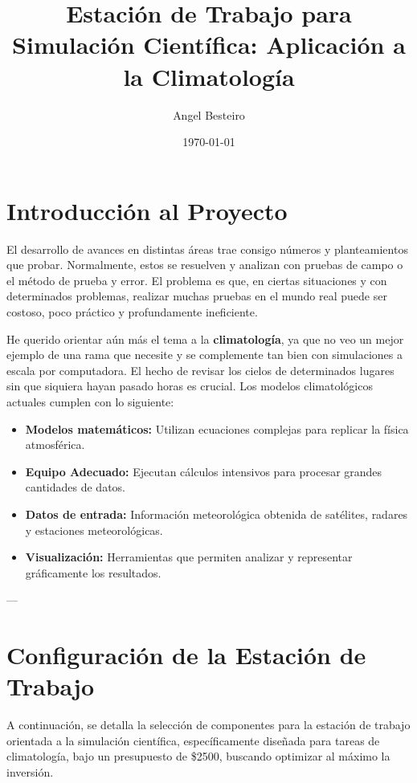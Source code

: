 \documentclass{article}
\title{Estación de Trabajo para Simulación Científica: Aplicación a la Climatología}
\author{Angel Besteiro}
\date{\today} %
\begin{document}
\maketitle %

\section*{Introducción al Proyecto}

El desarrollo de avances en distintas áreas trae consigo números y planteamientos que probar. Normalmente, estos se resuelven y analizan con pruebas de campo o el método de prueba y error. El problema es que, en ciertas situaciones y con determinados problemas, realizar muchas pruebas en el mundo real puede ser costoso, poco práctico y profundamente ineficiente.

He querido orientar aún más el tema a la \textbf{climatología}, ya que no veo un mejor ejemplo de una rama que necesite y se complemente tan bien con simulaciones a escala por computadora. El hecho de revisar los cielos de determinados lugares sin que siquiera hayan pasado horas es crucial. Los modelos climatológicos actuales cumplen con lo siguiente:
\begin{itemize}
    \item \textbf{Modelos matemáticos:} Utilizan ecuaciones complejas para replicar la física atmosférica.
    \item \textbf{Equipo Adecuado:} Ejecutan cálculos intensivos para procesar grandes cantidades de datos.
    \item \textbf{Datos de entrada:} Información meteorológica obtenida de satélites, radares y estaciones meteorológicas.
    \item \textbf{Visualización:} Herramientas que permiten analizar y representar gráficamente los resultados.
\end{itemize}

---

\section*{Configuración de la Estación de Trabajo}

A continuación, se detalla la selección de componentes para la estación de trabajo orientada a la simulación científica, específicamente diseñada para tareas de climatología, bajo un presupuesto de \$2500, buscando optimizar al máximo la inversión.
\end{document}
